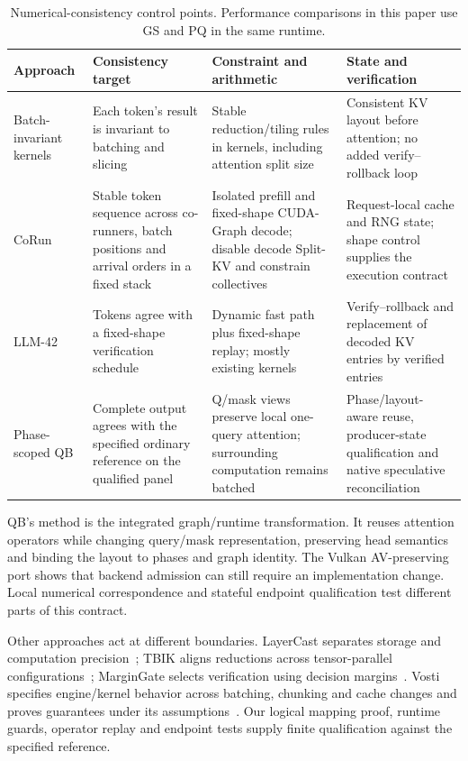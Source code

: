 \begin{table}[t]\centering\small
\caption{Numerical-consistency control points. Performance comparisons in this paper use GS and PQ in the same runtime.}\label{tab:relatedmechanisms}
\begin{tabularx}{\textwidth}{@{}>{\raggedright\arraybackslash}p{2.3cm}>{\raggedright\arraybackslash}p{3.3cm}YY@{}}\toprule
Approach & Consistency target & Constraint and arithmetic & State and verification\\\midrule
Batch-invariant kernels~\cite{thinkingmachines}
& Each token's result is invariant to batching and slicing
& Stable reduction/tiling rules in kernels, including attention split size
& Consistent KV layout before attention; no added verify--rollback loop\\
CoRun~\cite{corun}
& Stable token sequence across co-runners, batch positions and arrival orders in a fixed stack
& Isolated prefill and fixed-shape CUDA-Graph decode; disable decode Split-KV and constrain collectives
& Request-local cache and RNG state; shape control supplies the execution contract\\
LLM-42~\cite{llm42}
& Tokens agree with a fixed-shape verification schedule
& Dynamic fast path plus fixed-shape replay; mostly existing kernels
& Verify--rollback and replacement of decoded KV entries by verified entries\\
Phase-scoped QB
& Complete output agrees with the specified ordinary reference on the qualified panel
& Q/mask views preserve local one-query attention; surrounding computation remains batched
& Phase/layout-aware reuse, producer-state qualification and native speculative reconciliation\\\bottomrule
\end{tabularx}
\end{table}

QB's method is the integrated graph/runtime transformation. It reuses attention operators while changing query/mask representation, preserving head semantics and binding the layout to phases and graph identity. The Vulkan AV-preserving port shows that backend admission can still require an implementation change. Local numerical correspondence and stateful endpoint qualification test different parts of this contract.

Other approaches act at different boundaries. LayerCast separates storage and computation precision~\cite{layercast}; TBIK aligns reductions across tensor-parallel configurations~\cite{tbik}; MarginGate selects verification using decision margins~\cite{margingate}. Vosti specifies engine/kernel behavior across batching, chunking and cache changes and proves guarantees under its assumptions~\cite{vosti}. Our logical mapping proof, runtime guards, operator replay and endpoint tests supply finite qualification against the specified reference.


